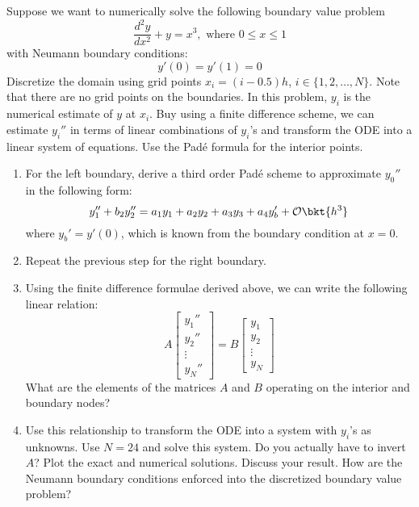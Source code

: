 \documentclass{article}
\begin{document}
\begin{enumerate}
		Suppose we want to numerically solve the following boundary value problem
		$$\dfrac{d^2y}{dx^2}+y = x^3, \text{ where }0\leq x \leq 1$$
		with Neumann boundary conditions:
		$$y'(0) = y'(1) = 0$$
		Discretize the domain using grid points $x_i = (i-0.5)h$, $i \in \{1,2,\ldots,N\}$. Note that there are no grid points on the boundaries. In this problem, $y_i$ is the numerical estimate of $y$ at $x_i$. Buy using a finite difference scheme, we can estimate $y_i''$ in terms of linear combinations of $y_i$'s and transform the ODE into a linear system of equations. Use the Pad\'e formula for the interior points.
		\begin{enumerate}
			\item
			For the left boundary, derive a third order Pad\'e scheme to approximate $y_0''$ in the following form:
			$$y_1''+b_2y_2'' = a_1y_1 + a_2y_2 + a_3y_3 + a_4y_b' + \mathcal{O}\bkt{h^3}$$
			where $y_b' = y'(0)$, which is known from the boundary condition at $x=0$.
			\item
			Repeat the previous step for the right boundary.
			\item
			Using the finite difference formulae derived above, we can write the following linear relation:
			$$A \begin{bmatrix}
			y_1''\\
			y_2''\\
			\vdots\\
			y_N''
			\end{bmatrix}
			=B \begin{bmatrix}
			y_1\\
			y_2\\
			\vdots\\
			y_N
			\end{bmatrix}$$
			What are the elements of the matrices $A$ and $B$ operating on the interior and boundary nodes?
			\item
			Use this relationship to transform the ODE into a system with $y_i$'s as unknowns. Use $N=24$ and solve this system. Do you actually have to invert $A$? Plot the exact and numerical solutions. Discuss your result. How are the Neumann boundary conditions enforced into the discretized boundary value problem?
		\end{enumerate}
	\end{enumerate}
\end{document}
